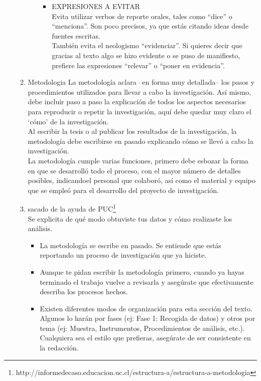 \documentclass[a4paper,14pt]{article}
\begin{document}
\begin{itemize}
\begin{enumerate}
\begin{enumerate}
\begin{itemize}
\item EXPRESIONES A EVITAR\\
    Evita utilizar verbos de reporte orales, tales como “dice” o “menciona”. Son poco precisos, ya que estás citando ideas desde fuentes escritas.\\
    También evita el neologismo “evidenciar”. Si quieres decir que gracias al texto algo se hizo evidente o se puso de manifiesto, prefiere las expresiones “relevar” o “poner en evidencia”.
\end{itemize}
\end{enumerate}
\item Metodologia
La metodología aclara –en forma muy detallada– los pasos y procedimientos utilizados para  llevar  a  cabo  la  investigación.  Así  mismo,  debe  incluir  paso  a  paso  la  explicación  de  todos  los  aspectos  necesarios  para  reproducir  o  repetir  la  investigación,  aquí  debe  quedar  muy claro el ‘cómo’ de la investigación.\\
Al escribir la tesis o al publicar los resultados de la investigación, la metodología debe escribirse en pasado explicando cómo se llevó a cabo la investigación.\\
La  metodología  cumple  varias  funciones,    primero  debe  esbozar  la  forma  en  que  se  desarrolló todo el proceso, con el mayor número de detalles posibles, indicandoel personal que  colaboró,  así  como  el  material  y  equipo    que  se  empleó  para  el  desarrollo  del  proyecto  de investigación.
\item sacado de la ayuda de PUC\footnote{http://informedecaso.educacion.uc.cl/estructura-a/estructura-a-metodologia}\\
Se explicita de qué modo obtuviste tus datos y cómo realizaste los análisis.
\begin{itemize}
\item La metodología se escribe en pasado. Se entiende que estás reportando un proceso de investigación que ya hiciste.
\item Aunque te pidan escribir la metodología primero, cuando ya hayas terminado el trabajo vuelve a revisarla y asegúrate que efectivamente describa los procesos hechos.
\item Existen diferentes modos de organización para esta sección del texto. Algunos lo harán por fases (ej: Fase 1: Recogida de datos) y otros por tema (ej: Muestra, Instrumentos, Procedimientos de análisis, etc.). Cualquiera sea el estilo que prefieras, asegúrate de ser consistente en la redacción.

\end{itemize}
\end{enumerate}
\end{itemize}
\end{document}
